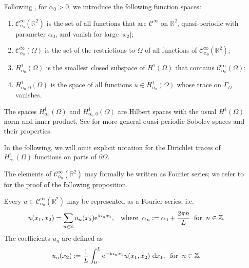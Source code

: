 \documentclass[a4paper,10pt]{article}
\newcommand{\ri}{{\mathrm i}}
\newcommand{\re}{{\mathrm e}}
\newcommand{\rd}{{\,\mathrm d}}
\newcommand{\GD}{{\Gamma_D}}
\begin{document}
	Following \cite[\S3.1]{BonnetBD1994}, for $\alpha_0>0$, we introduce the following function spaces:
	\begin{enumerate}
		\item $\mathcal{C}_{\alpha_0}^\infty(\mathbb{R}^2)$ is the set of all functions that are $\mathcal{C}^\infty$ on $\mathbb{R}^2$, quasi-periodic with parameter $\alpha_0$, and vanish for large $|x_2|$;
		\item $\mathcal{C}_{\alpha_0}^\infty(\Omega)$ is the set of the restrictions to $\Omega$ of all functions of $\mathcal{C}_{\alpha_0}^\infty(\mathbb{R}^2)$;
		\item $H^1_{\alpha_0}(\Omega)$ is the smallest  closed subspace of $H^1(\Omega)$ that contains $\mathcal{C}_{\alpha_0}^\infty(\Omega)$;
		\item $H^1_{\alpha_0, 0}(\Omega)$ is the space of all functions $u \in H^1_{\alpha_0}(\Omega)$ 
		whose trace on $\GD$ vanishes.
	\end{enumerate}
	The spaces $H^1_{\alpha_0}(\Omega)$ and  $H^1_{\alpha_0,0}(\Omega)$ are Hilbert spaces with the usual $H^1(\Omega)$ norm and inner product.
	See \cite{Pinto2020} for more general quasi-periodic Sobolev spaces and their properties.
	
	In the following, we will omit explicit notation for the Dirichlet traces of $H^1_{\alpha_0}(\Omega)$ functions on parts of $\partial\Omega$.
	
	The elements of $\mathcal{C}_{\alpha_0}^\infty(\mathbb{R}^2)$ may formally be written as Fourier series; we refer to \cite[Prop.~2.6]{Pinto2020} for the proof of the following proposition.
	\begin{prop} \label{fourier}
		Every $u \in \mathcal{C}_{\alpha_0}^\infty(\mathbb{R}^2)$ may be represented as a Fourier series, i.e.
		\begin{equation*}
			u(x_1, x_2) = \sum_{n \in \mathbb{Z}} u_n(x_2) \re^{\ri \alpha_n x_1}, \hspace{0.3cm} \text{where} \hspace{0.2cm} \alpha_n := \alpha_0 + \frac{2\pi n}{L} \hspace{0.2cm} \text{for} \hspace{0.2cm} n \in \mathbb{Z}.
		\end{equation*}
		The coefficients $u_n$ are defined as
		\begin{equation} \label{fourier_coeff}
			u_n(x_2) := \frac{1}{L} \int_0^{L} \re^{-\ri\alpha_n x_1} u(x_1,x_2) \, \rd x_1, \hspace{0.2cm} \text{for} \hspace{0.2cm} n \in \mathbb{Z}.
		\end{equation}
	\end{prop} 
	
\end{document}
